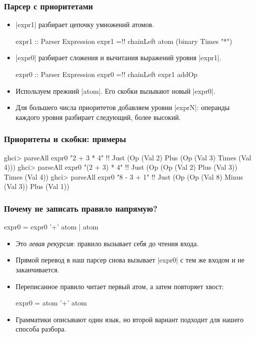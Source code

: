 \documentclass[11pt]{beamer}
\begin{document}
\begin{frame}[fragile]
  \frametitle{Парсер с приоритетами}
  \begin{itemize}
    \item \haskinline|expr1| разбирает цепочку умножений атомов.
      \pause
      \begin{haskellsmall}
        expr1 :: Parser Expression
        expr1 =!\pause! chainLeft atom (binary Times "*")
      \end{haskellsmall}
      \pause
    \item \haskinline|expr0| разбирает сложения и вычитания выражений уровня \haskinline|expr1|.
      \pause
      \begin{haskellsmall}
        expr0 :: Parser Expression
        expr0 =!\pause! chainLeft expr1 addOp
      \end{haskellsmall}
    \item Используем прежний \haskinline|atom|. Его скобки вызывают новый \haskinline|expr0|.
    \item Для большего числа приоритетов добавляем уровни \haskinline|exprN|: операнды каждого уровня разбирает следующий, более высокий.
  \end{itemize}
\end{frame}

\begin{frame}[fragile]
  \frametitle{Приоритеты и скобки: примеры}
  \begin{haskellsmall}
    ghci> parseAll expr0 "2 + 3 * 4" !\pause!
    Just (Op (Val 2) Plus
             (Op (Val 3) Times (Val 4)))
    ghci> parseAll expr0 "(2 + 3) * 4" !\pause!
    Just (Op (Op (Val 2) Plus (Val 3))
             Times (Val 4))
    ghci> parseAll expr0 "8 - 3 + 1" !\pause!
    Just (Op (Op (Val 8) Minus (Val 3))
             Plus (Val 1))
  \end{haskellsmall}
\end{frame}

\begin{frame}[fragile]
  \frametitle{Почему не записать правило напрямую?}
  \begin{haskell}
    expr0 = expr0 '+' atom | atom
  \end{haskell}
  \begin{itemize}
    \item Это \emph{левая рекурсия}: правило вызывает себя до чтения входа.
      \pause
    \item Прямой перевод в наш парсер снова вызывает \haskinline|expr0| с тем же входом и не заканчивается.
    \item Переписанное правило читает первый атом, а затем повторяет хвост:
      \begin{haskell}
        expr0 = atom { '+' atom }
      \end{haskell}
    \item Грамматики описывают один язык, но второй вариант подходит для нашего способа разбора.
  \end{itemize}
\end{frame}
\end{document}

